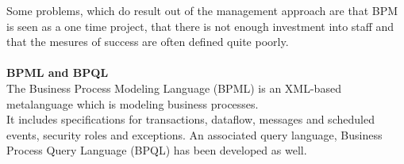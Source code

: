 \documentclass[12pt]{article}
\begin{document}
Some problems, which do result out of the management approach are that BPM is seen as a one time project, that there is not enough investment into staff and that the mesures of success are often defined quite poorly.\cite{bpmchall}\\ \\ \noindent
\textbf{BPML and BPQL} \\
The Business Process Modeling Language (BPML) is an XML-based metalanguage which is modeling business processes.\\It includes specifications for transactions, dataflow, messages and scheduled events, security roles and exceptions. An associated query language, Business Process Query Language (BPQL) has been developed as well.  \cite{bpmldefmr}
\end{document}
